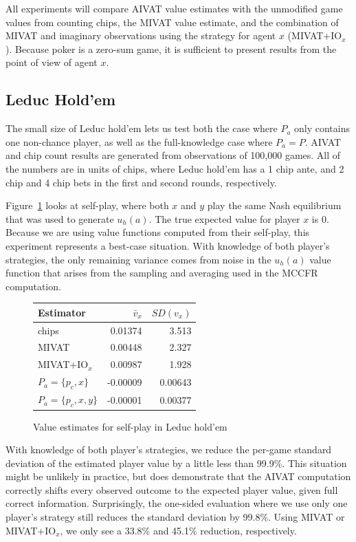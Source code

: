 \documentclass[letterpaper]{article}
\def\VAT{AIVAT}
\def\leduc{Leduc hold'em}
\def\Leduc{Leduc Hold'em}
\begin{document}
All experiments will compare \VAT{} value estimates with the
unmodified game values from counting chips, the MIVAT value estimate,
and the combination of MIVAT and imaginary observations using the
strategy for agent $x$ (MIVAT+IO$_x$). Because poker is a zero-sum
game, it is sufficient to present results from the point of view of
agent $x$.


\subsection{\Leduc{}}
The small size of \leduc{} lets us test both the case where $P_a$ only
contains one non-chance player, as well as the full-knowledge case
where $P_a = P$. \VAT{} and chip count results are generated from
observations of 100,000 games. All of the numbers are in units of
chips, where \leduc{} has a 1 chip ante, and 2 chip and 4 chip bets in
the first and second rounds, respectively.

Figure~\ref{fig:leduc_selfplay} looks at self-play, where both $x$ and
$y$ play the same Nash equilibrium that was used to generate
$u_h(a)$. The true expected value for player $x$ is 0. Because we are
using value functions computed from their self-play, this experiment
represents a best-case situation. With knowledge of both player's
strategies, the only remaining variance comes from noise in the
$u_h(a)$ value function that arises from the sampling and averaging
used in the MCCFR computation.

\begin{figure}[!ht]
\centering
\begin{tabular}{|l||r|r|}
\hline
Estimator & $\bar{v}_x$ & $SD(v_x)$ \\
\hline
chips & 0.01374 & 3.513 \\
MIVAT & 0.00448 & 2.327 \\
MIVAT+IO$_x$ & 0.00987 & 1.928  \\
$P_a=\{p_c, x\}$ & -0.00009 & 0.00643 \\
$P_a=\{p_c, x, y\}$ & -0.00001 & 0.00377 \\
\hline
\end{tabular}
\caption{Value estimates for self-play in \leduc{}}
\label{fig:leduc_selfplay}
\end{figure}

With knowledge of both player's strategies, we reduce the per-game
standard deviation of the estimated player value by a little less than
99.9\%. This situation might be unlikely in practice, but does
demonstrate that the \VAT{} computation correctly shifts every
observed outcome to the expected player value, given full correct
information. Surprisingly, the one-sided evaluation where we use only
one player's strategy still reduces the standard deviation by
99.8\%. Using MIVAT or MIVAT+IO$_x$, we only see a 33.8\% and 45.1\%
reduction, respectively.
\end{document}
